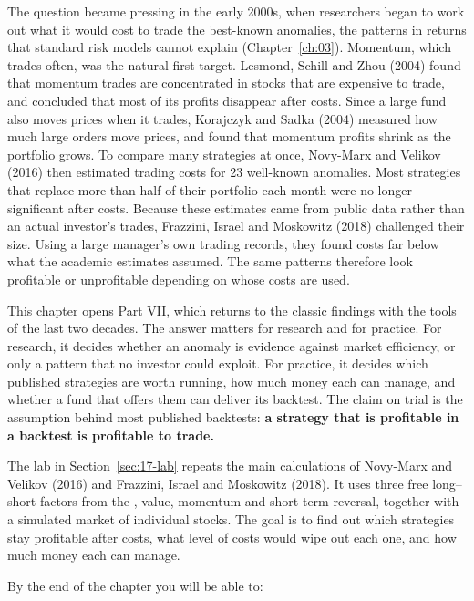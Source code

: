 The question became pressing in the early 2000s, when researchers began to work out what it would cost to trade the best-known anomalies, the patterns in returns that standard risk models cannot explain (Chapter~\ref{ch:03}). Momentum, which trades often, was the natural first target. Lesmond, Schill and Zhou (2004) found that momentum trades are concentrated in stocks that are expensive to trade, and concluded that most of its profits disappear after costs. Since a large fund also moves prices when it trades, Korajczyk and Sadka (2004) measured how much large orders move prices, and found that momentum profits shrink as the portfolio grows. To compare many strategies at once, Novy-Marx and Velikov (2016) then estimated trading costs for 23 well-known anomalies. Most strategies that replace more than half of their portfolio each month were no longer significant after costs. Because these estimates came from public data rather than an actual investor's trades, Frazzini, Israel and Moskowitz (2018) challenged their size. Using a large manager's own trading records, they found costs far below what the academic estimates assumed. The same patterns therefore look profitable or unprofitable depending on whose costs are used.

This chapter opens Part VII, which returns to the classic findings with the tools of the last two decades. The answer matters for research and for practice. For research, it decides whether an anomaly is evidence against market efficiency, or only a pattern that no investor could exploit. For practice, it decides which published strategies are worth running, how much money each can manage, and whether a fund that offers them can deliver its backtest. The claim on trial is the assumption behind most published backtests: \textbf{a strategy that is profitable in a backtest is profitable to trade.}

The lab in Section~\ref{sec:17-lab} repeats the main calculations of Novy-Marx and Velikov (2016) and Frazzini, Israel and Moskowitz (2018). It uses three free long--short factors from the , value, momentum and short-term reversal, together with a simulated market of individual stocks. The goal is to find out which strategies stay profitable after costs, what level of costs would wipe out each one, and how much money each can manage.

By the end of the chapter you will be able to:

